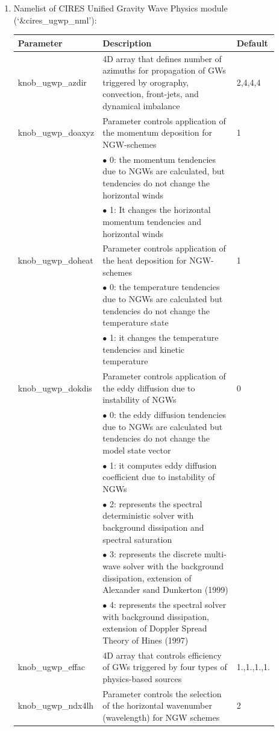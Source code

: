 \documentclass[11pt,fleqn]{report}              %
\begin{document}
\begin{enumerate}
\item Namelist of CIRES Unified Gravity Wave Physics module (`\&cires\_ugwp\_nml'):
{
\scriptsize
\begin{longtable}{p{0.16\linewidth} | p{0.66\linewidth} | p{0.08\linewidth} }
\hline
\hline
Parameter & Description & Default \\
\hline
 knob\_ugwp\_azdir & 4D array that defines number of azimuths for propagation of GWs triggered by orography, convection, front-jets, and dynamical imbalance & 2,4,4,4  \\
 knob\_ugwp\_doaxyz  & Parameter controls application of the momentum deposition for NGW-schemes & 1 \\
& $\bullet$ 0: the momentum tendencies due to NGWs are calculated, but tendencies do not change the horizontal winds & \\
& $\bullet$ 1: It changes the horizontal momentum tendencies and horizontal winds & \\
 knob\_ugwp\_doheat  & Parameter controls application of the heat deposition for NGW-schemes & 1 \\
& $\bullet$ 0: the temperature tendencies due to NGWs are calculated but tendencies do not change the temperature state & \\
& $\bullet$ 1: it changes the temperature tendencies and kinetic temperature & \\
 knob\_ugwp\_dokdis  & Parameter controls application of the eddy diffusion due to instability of NGWs & 0 \\
& $\bullet$ 0: the eddy diffusion tendencies due to NGWs are calculated but tendencies do not change the model state vector & \\
& $\bullet$ 1: it computes eddy diffusion coefficient due to instability of NGWs & \\
& $\bullet$ 2: represents the spectral deterministic solver with background dissipation and spectral saturation & \\
& $\bullet$ 3: represents the discrete multi-wave solver with the background dissipation, extension of Alexander sand Dunkerton (1999) & \\
& $\bullet$ 4: represents the spectral solver with background dissipation, extension of Doppler Spread Theory of Hines (1997) & \\
 knob\_ugwp\_effac  & 4D array that controls efficiency of GWs triggered by four types of physics-based sources &  1.,1.,1.,1. \\
 knob\_ugwp\_ndx4lh  & Parameter controls the selection of the horizontal wavenumber (wavelength) for NGW schemes & 2 \\

\end{longtable}}
\end{enumerate}
\end{document}
